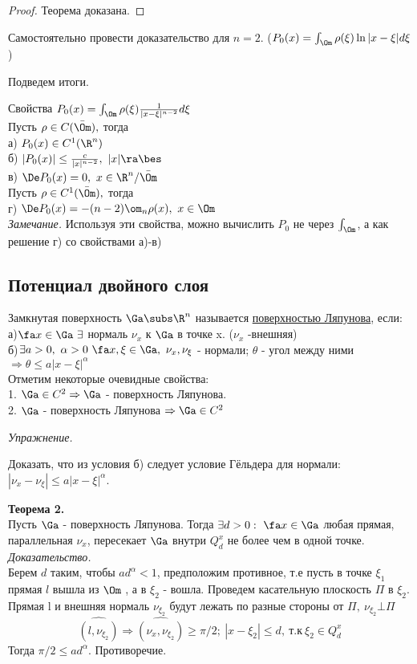 \documentclass[a4paper,draft]{article}
\begin{document}
\begin{proof}
Теорема доказана.
\end{proof}
\begin{problem}
Самостоятельно провести доказательство для $n=2$.
($P_0(x)=\int_\Om\rho(\xi)\ln{|x-\xi|}d\xi$)
\end{problem}

Подведем итоги.

Свойства $P_0(x)=\int_\Om\rho(\xi)\frac{1}{|x-\xi|^{n-2}}d\xi$\\
Пусть $\rho\in C(\bar{\Om}),$ тогда\\
а) $P_0(x)\in C^1(\R^n)$\\
б) $|P_0(x)|\le\frac{c}{|x|^{n-2}},\ |x|\ra\bes$\\
в) $\De P_0(x)=0,\ x\in\R^n/\bar{\Om}$\\
Пусть $\rho\in C^1(\bar{\Om}),$ тогда\\
г) $\De P_0(x)=-(n-2)\om_n\rho(x),\ x\in\Om$\\

\textit{Замечание.}
Используя эти свойства, можно вычислить $P_0$ не через $\int_\Om$,
а как решение г) со свойствами а)-в)

\subsection{Потенциал двойного слоя}

\begin{df}
Замкнутая поверхность $\Ga\subs\R^n$ называется \underline{поверхностью Ляпунова}, если:
а)$\fa x\in\Ga\ \exists$ нормаль $\nu_x$ к $\Ga$ в точке x. ($\nu_x$ -внешняя)\\
б)$\exists a>0,\ \alpha >0\ \fa x,\xi\in\Ga,\ \nu_x,\nu_\xi$ - нормали;
 $\theta$ - угол между ними $\Rightarrow \theta\le a|x-\xi|^\alpha$ \\
Отметим некоторые очевидные свойства:\\
1. $\Ga\in C^2\Rightarrow \Ga$ - поверхность Ляпунова. \\
2. $\Ga$ - поверхность Ляпунова $\Rightarrow \Ga \in C^2$\\
\end{df}

\textit{Упражнение.}

Доказать, что из условия б) следует условие Гёльдера для нормали:
$ |\nu_x-\nu_\xi|\le a|x-\xi|^\alpha$.

\textbf{Теорема 2.}\\
Пусть $\Ga$ - поверхность Ляпунова. Тогда $\exists d>0:\ \fa x\in\Ga$
любая прямая, параллельная $\nu_x$, пересекает $\Ga$ внутри $Q_d^x$ не более чем в одной точке.\\
\textit{Доказательство.}\\
Берем $d$ таким, чтобы $ad^\alpha<1$, предположим противное, т.е
пусть в точке $\xi_1$ прямая $l$ вышла из $\Om$ , а в $\xi_2$ - вошла.
Проведем касательную плоскость $\Pi$ в $\xi_2$. Прямая l
и внешняя нормаль $\nu_{\xi_2}$ будут лежать по разные стороны от $\Pi,\ \nu_{\xi_2}\bot\Pi$
$$
\widehat{(l,\nu_{\xi_2})}\Rightarrow
\widehat{(\nu_x,\nu_{\xi_2})}\ge \pi/2;\ |x-\xi_2|\le d,\ \text{т.к}\ \xi_2\in Q_d^x
$$
Тогда $\pi/2\le ad^\alpha$. Противоречие.\\
\end{document}

